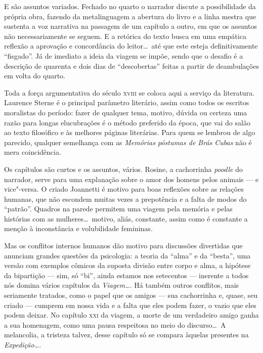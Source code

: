 E são assuntos variados. Fechado no quarto o narrador discute a
possibilidade da própria obra, fazendo da metalinguagem a abertura do
livro e a linha mestra que sustenta a voz narrativa na passagem de um
capítulo a outro, em que os assuntos não necessariamente se seguem. E a
retórica do texto busca em uma empática reflexão a aprovação e
concordância do leitor\ldots\ até que este esteja definitivamente
``fisgado''. Já de imediato a ideia da viagem se impõe, sendo que o
desafio é a descrição de quarenta e dois dias de ``descobertas'' feitas a
partir de deambulações em volta do quarto. 

Toda a força argumentativa do século \textsc{xviii} se coloca aqui a serviço da
literatura. Laurence Sterne é o principal parâmetro literário, assim
como todos os escritos moralistas do período: fazer de qualquer tema,
motivo, dúvida ou certeza uma razão para longas elucubrações é o método
preferido da época, que vai do salão ao texto filosófico e às melhores
páginas literárias. Para quem se lembrou de algo parecido, qualquer
semelhança com as \textit{Memórias póstumas de Brás Cubas} não é mera
coincidência.

Os capítulos são curtos e os assuntos, vários. Rosine, a cachorrinha
\textit{poodle} do narrador, serve para uma explanação sobre o amor dos homens
pelos animais --- e vice"-versa. O criado Joannetti é motivo para boas
reflexões sobre as relações humanas, que não escondem muitas vezes a
prepotência e a falta de modos do ``patrão''. Quadros na parede permitem
uma viagem pela memória e pelas histórias com as mulheres\ldots\ motivo,
aliás, constante, assim como é constante a menção à inconstância e volubilidade femininas. 

Mas os conflitos internos humanos dão motivo para discussões divertidas
que anunciam grandes questões da psicologia: a teoria da ``alma'' e da
``besta'', uma versão com exemplos cômicos da suposta divisão entre corpo
e alma, a hipótese da bipartição --- sim,  só ``bi'', ainda estamos nos
setecentos --- inerente a todos nós domina vários capítulos da
\textit{Viagem\ldots}. Há também outros conflitos, mais seriamente
tratados, como o papel que os amigos --- sua cachorrinha e, quase, seu
criado --- cumprem em nossa vida  e a falta que eles podem fazer, o vazio
que eles podem deixar. No capítulo \textsc{xxi} da viagem, a morte de um
verdadeiro amigo ganha a sua homenagem, como uma pausa respeitosa no
meio do discurso\ldots\ A melancolia, a tristeza talvez, desse capítulo só
se compara àquelas presentes na \textit{Expedição\ldots}. 

